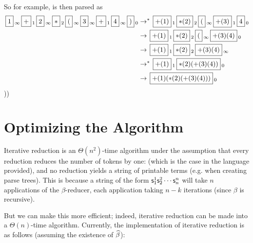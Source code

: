 \documentclass{llncs}
\newcounter{algo}
\begin{document}
So for example,  is then parsed as
\begin{align*}
    \mb1_\infty \mb+_1 \mb2_\infty \mb*_2 \mb(_\infty \mb3_\infty \mb+_1 \mb4_\infty \mb)_0 &\to^* \mb{+(1)}_1 \mb{*(2)}_2 \mb(_\infty \mb{+(3)}_1 \mb{4}_0\\
    &\to \mb{+(1)}_1 \mb{*(2)}_2 \mb(_\infty \mb{+(3)(4)}_0\\
    &\to \mb{+(1)}_1 \mb{*(2)}_2 \mb{+(3)(4)}_\infty\\
    &\to^* \mb{+(1)}_1 \mb{*(2)(+(3)(4))}_0\\
    &\to \mb{+(1)(*(2)(+(3)(4)))}_0
\end{align*}
\gobble)\gobble)

\section{Optimizing the Algorithm}

Iterative reduction is an $\Theta(n^2)$-time algorithm under the assumption that every reduction reduces the number of tokens by one: (which is the case in the language provided), and no reduction yields a string of printable terms (e.g. when creating parse trees).
This is because a string of the form $\mathsf{s}^1_1\mathsf{s}^2_2\cdots\mathsf{s}^n_n$ will take $n$ applications of the $\beta$-reducer, each application taking $n-k$ iterations (since $\beta$ is recursive).

But we can make this more efficient; indeed, iterative reduction can be made into a $\Theta(n)$-time algorithm.
Currently, the implementation of iterative reduction is as follows (assuming the existence of $\widehat\beta$):
\end{document}
